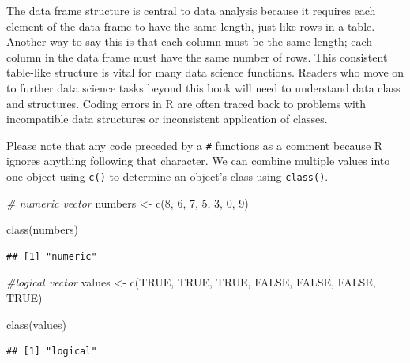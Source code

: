 \documentclass[
  krantz2]{krantz}
\makeatletter
\newenvironment{Shaded}{\begin{snugshade}}{\end{snugshade}}
\newcommand{\CommentTok}[1]{\textcolor[rgb]{0.37,0.37,0.37}{\textit{#1}}}
\newcommand{\ConstantTok}[1]{\textcolor[rgb]{0,0,0}{#1}}
\newcommand{\DecValTok}[1]{\textcolor[rgb]{0.06,0.06,0.06}{#1}}
\newcommand{\FunctionTok}[1]{\textcolor[rgb]{0,0,0}{#1}}
\newcommand{\NormalTok}[1]{#1}
\newcommand{\OtherTok}[1]{\textcolor[rgb]{0.37,0.37,0.37}{#1}}
\newenvironment{kframe}{%
\medskip{}
\setlength{\fboxsep}{.8em}
 \def\at@end@of@kframe{}%
 \ifinner\ifhmode%
  \def\at@end@of@kframe{\end{minipage}}%
  \begin{minipage}{\columnwidth}%
 \fi\fi%
 \def\FrameCommand##1{\hskip\@totalleftmargin \hskip-\fboxsep
 \colorbox{shadecolor}{##1}\hskip-\fboxsep
     \hskip-\linewidth \hskip-\@totalleftmargin \hskip\columnwidth}%
 \MakeFramed {\advance\hsize-\width
   \@totalleftmargin\z@ \linewidth\hsize
   \@setminipage}}%
 {\par\unskip\endMakeFramed%
 \at@end@of@kframe}
\renewenvironment{Shaded}{\begin{kframe}}{\end{kframe}}
\makeatother
\begin{document}
The data frame structure is central to data analysis because it requires each element of the data frame to have the same length, just like rows in a table. Another way to say this is that each column must be the same length; each column in the data frame must have the same number of rows. This consistent table-like structure is vital for many data science functions. Readers who move on to further data science tasks beyond this book will need to understand data class and structures. Coding errors in R are often traced back to problems with incompatible data structures or inconsistent application of classes.

Please note that any code preceded by a \texttt{\#} functions as a comment because R ignores anything following that character. We can combine multiple values into one object using \texttt{c()} to determine an object's class using \texttt{class()}.

\begin{Shaded}
\begin{Highlighting}[]
\CommentTok{\# numeric vector}
\NormalTok{numbers }\OtherTok{\textless{}{-}} \FunctionTok{c}\NormalTok{(}\DecValTok{8}\NormalTok{, }\DecValTok{6}\NormalTok{, }\DecValTok{7}\NormalTok{, }\DecValTok{5}\NormalTok{, }\DecValTok{3}\NormalTok{, }\DecValTok{0}\NormalTok{, }\DecValTok{9}\NormalTok{) }

\FunctionTok{class}\NormalTok{(numbers)}
\end{Highlighting}
\end{Shaded}

\begin{verbatim}
## [1] "numeric"
\end{verbatim}

\begin{Shaded}
\begin{Highlighting}[]
\CommentTok{\#logical vector}
\NormalTok{values }\OtherTok{\textless{}{-}} \FunctionTok{c}\NormalTok{(}\ConstantTok{TRUE}\NormalTok{, }\ConstantTok{TRUE}\NormalTok{, }\ConstantTok{TRUE}\NormalTok{, }\ConstantTok{FALSE}\NormalTok{, }\ConstantTok{FALSE}\NormalTok{, }\ConstantTok{FALSE}\NormalTok{, }\ConstantTok{TRUE}\NormalTok{)}

\FunctionTok{class}\NormalTok{(values)}
\end{Highlighting}
\end{Shaded}

\begin{verbatim}
## [1] "logical"
\end{verbatim}
\end{document}
